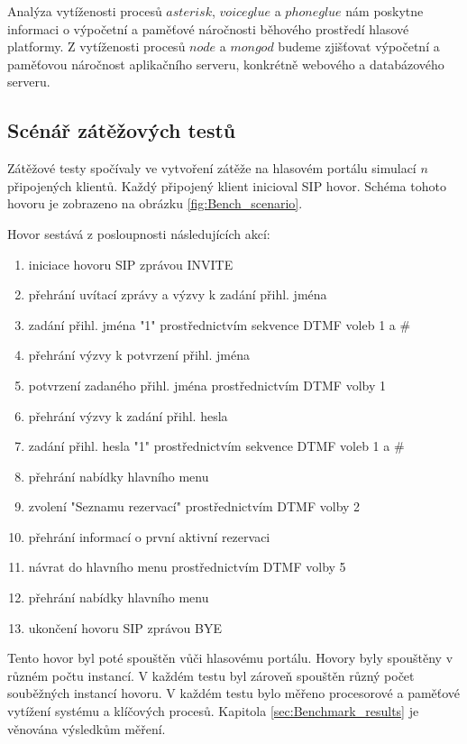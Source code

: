 \documentclass[ing,male,java,dept460,twoside]{diploma}						%
\begin{document}
Analýza vytíženosti procesů $asterisk$, $voiceglue$ a $phoneglue$ nám poskytne informaci o výpočetní a paměťové náročnosti běhového prostředí hlasové platformy. Z vytíženosti procesů $node$ a $mongod$ budeme zjišťovat výpočetní a paměťovou náročnost aplikačního serveru, konkrétně webového a databázového serveru.

\subsection{Scénář zátěžových testů}
Zátěžové testy spočívaly ve vytvoření zátěže na hlasovém portálu simulací $n$ připojených klientů. Každý připojený klient inicioval SIP hovor. Schéma tohoto hovoru je zobrazeno na obrázku \ref{fig:Bench_scenario}.

Hovor sestává z posloupnosti následujících akcí:

\begin{enumerate}
\item iniciace hovoru SIP zprávou INVITE
\item přehrání uvítací zprávy a výzvy k zadání přihl. jména
\item zadání přihl. jména "1" prostřednictvím sekvence DTMF voleb 1 a \#
\item přehrání výzvy k potvrzení přihl. jména
\item potvrzení zadaného přihl. jména prostřednictvím DTMF volby 1
\item přehrání výzvy k zadání přihl. hesla
\item zadání přihl. hesla "1" prostřednictvím sekvence DTMF voleb 1 a \#
\item přehrání nabídky hlavního menu
\item zvolení "Seznamu rezervací" prostřednictvím DTMF volby 2
\item přehrání informací o první aktivní rezervaci
\item návrat do hlavního menu prostřednictvím DTMF volby 5
\item přehrání nabídky hlavního menu
\item ukončení hovoru SIP zprávou BYE
\end{enumerate}

Tento hovor byl poté spouštěn vůči hlasovému portálu. Hovory byly spouštěny v různém počtu instancí. V každém testu byl zároveň spouštěn různý počet souběžných instancí hovoru. V každém testu bylo měřeno procesorové a paměťové vytížení systému a klíčových procesů. Kapitola \ref{sec:Benchmark_results} je věnována výsledkům měření.
\end{document}
